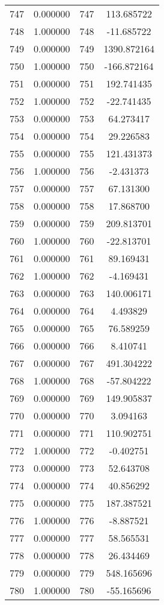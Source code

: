 \documentclass[12pt]{article}
\begin{document}
\begin{longtable}{@{}cccc@{}}
747 & 0.000000 & 747 & 113.685722 \\
748 & 1.000000 & 748 & -11.685722 \\
749 & 0.000000 & 749 & 1390.872164 \\
750 & 1.000000 & 750 & -166.872164 \\
751 & 0.000000 & 751 & 192.741435 \\
752 & 1.000000 & 752 & -22.741435 \\
753 & 0.000000 & 753 & 64.273417 \\
754 & 0.000000 & 754 & 29.226583 \\
755 & 0.000000 & 755 & 121.431373 \\
756 & 1.000000 & 756 & -2.431373 \\
757 & 0.000000 & 757 & 67.131300 \\
758 & 0.000000 & 758 & 17.868700 \\
759 & 0.000000 & 759 & 209.813701 \\
760 & 1.000000 & 760 & -22.813701 \\
761 & 0.000000 & 761 & 89.169431 \\
762 & 1.000000 & 762 & -4.169431 \\
763 & 0.000000 & 763 & 140.006171 \\
764 & 0.000000 & 764 & 4.493829 \\
765 & 0.000000 & 765 & 76.589259 \\
766 & 0.000000 & 766 & 8.410741 \\
767 & 0.000000 & 767 & 491.304222 \\
768 & 1.000000 & 768 & -57.804222 \\
769 & 0.000000 & 769 & 149.905837 \\
770 & 0.000000 & 770 & 3.094163 \\
771 & 0.000000 & 771 & 110.902751 \\
772 & 1.000000 & 772 & -0.402751 \\
773 & 0.000000 & 773 & 52.643708 \\
774 & 0.000000 & 774 & 40.856292 \\
775 & 0.000000 & 775 & 187.387521 \\
776 & 1.000000 & 776 & -8.887521 \\
777 & 0.000000 & 777 & 58.565531 \\
778 & 0.000000 & 778 & 26.434469 \\
779 & 0.000000 & 779 & 548.165696 \\
780 & 1.000000 & 780 & -55.165696 \\

\end{longtable}
\end{document}
